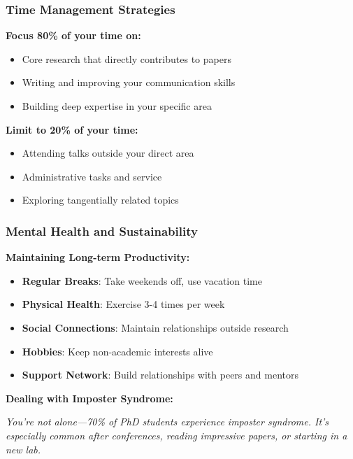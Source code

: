 \documentclass[11pt,a4paper]{article}
\begin{document}
\subsubsection{Time Management Strategies}

\begin{tcolorbox}[colback=green!10,colframe=green!50,title=The 80/20 Rule for PhD Productivity]
\textbf{Focus 80\% of your time on:}
\begin{itemize}
    \item Core research that directly contributes to papers
    \item Writing and improving your communication skills
    \item Building deep expertise in your specific area
\end{itemize}

\textbf{Limit to 20\% of your time:}
\begin{itemize}
    \item Attending talks outside your direct area
    \item Administrative tasks and service
    \item Exploring tangentially related topics
\end{itemize}
\end{tcolorbox}

\subsubsection{Mental Health and Sustainability}

\textbf{Maintaining Long-term Productivity:}
\begin{itemize}
    \item \textbf{Regular Breaks}: Take weekends off, use vacation time
    \item \textbf{Physical Health}: Exercise 3-4 times per week
    \item \textbf{Social Connections}: Maintain relationships outside research
    \item \textbf{Hobbies}: Keep non-academic interests alive
    \item \textbf{Support Network}: Build relationships with peers and mentors
\end{itemize}

\textbf{Dealing with Imposter Syndrome:}

\textit{You're not alone—70\% of PhD students experience imposter syndrome. It's especially common after conferences, reading impressive papers, or starting in a new lab.}
\end{document}
